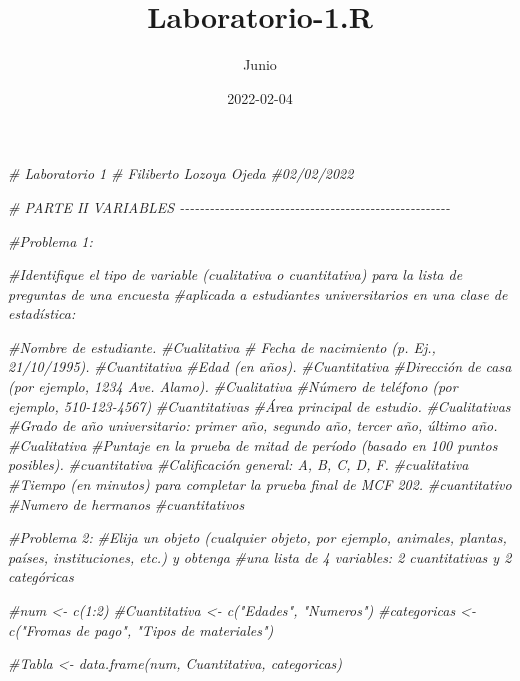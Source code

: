 \documentclass[
]{article}
\title{Laboratorio-1.R}
\author{Junio}
\date{2022-02-04}
\newenvironment{Shaded}{\begin{snugshade}}{\end{snugshade}}
\newcommand{\CommentTok}[1]{\textcolor[rgb]{0.56,0.35,0.01}{\textit{#1}}}
\begin{document}
\maketitle

\begin{Shaded}
\begin{Highlighting}[]
\CommentTok{\# Laboratorio 1 }
\CommentTok{\# Filiberto Lozoya Ojeda}
\CommentTok{\#02/02/2022}


\CommentTok{\# PARTE II VARIABLES {-}{-}{-}{-}{-}{-}{-}{-}{-}{-}{-}{-}{-}{-}{-}{-}{-}{-}{-}{-}{-}{-}{-}{-}{-}{-}{-}{-}{-}{-}{-}{-}{-}{-}{-}{-}{-}{-}{-}{-}{-}{-}{-}{-}{-}{-}{-}{-}{-}{-}{-}{-}{-}{-}}

\CommentTok{\#Problema 1:}

\CommentTok{\#Identifique el tipo de variable (cualitativa o cuantitativa) para la lista de preguntas de una encuesta}
\CommentTok{\#aplicada a estudiantes universitarios en una clase de estadística:}
  
\CommentTok{\#Nombre de estudiante.}
\CommentTok{\#Cualitativa}
\CommentTok{\# Fecha de nacimiento (p. Ej., 21/10/1995).}
\CommentTok{\#Cuantitativa}
\CommentTok{\#Edad (en años).}
\CommentTok{\#Cuantitativa}
\CommentTok{\#Dirección de casa (por ejemplo, 1234 Ave. Alamo).}
\CommentTok{\#Cualitativa}
\CommentTok{\#Número de teléfono (por ejemplo, 510{-}123{-}4567)}
\CommentTok{\#Cuantitativas}
\CommentTok{\#Área principal de estudio.}
\CommentTok{\#Cualitativas}
\CommentTok{\#Grado de año universitario: primer año, segundo año, tercer año, último año.}
\CommentTok{\#Cualitativa}
\CommentTok{\#Puntaje en la prueba de mitad de período (basado en 100 puntos posibles).}
\CommentTok{\#cuantitativa}
\CommentTok{\#Calificación general: A, B, C, D, F.}
\CommentTok{\#cualitativa}
\CommentTok{\#Tiempo (en minutos) para completar la prueba final de MCF 202.}
\CommentTok{\#cuantitativo}
\CommentTok{\#Numero de hermanos}
\CommentTok{\#cuantitativos}

\CommentTok{\#Problema 2:}
\CommentTok{\#Elija un objeto (cualquier objeto, por ejemplo, animales, plantas, países, instituciones, etc.) y obtenga}
\CommentTok{\#una lista de 4 variables: 2 cuantitativas y 2 categóricas}

\CommentTok{\#num \textless{}{-} c(1:2)}
\CommentTok{\#Cuantitativa \textless{}{-} c("Edades", "Numeros")}
\CommentTok{\#categoricas \textless{}{-} c("Fromas de pago", "Tipos de materiales")}

\CommentTok{\#Tabla \textless{}{-} data.frame(num, Cuantitativa, categoricas)}


\end{Highlighting}
\end{Shaded}
\end{document}
